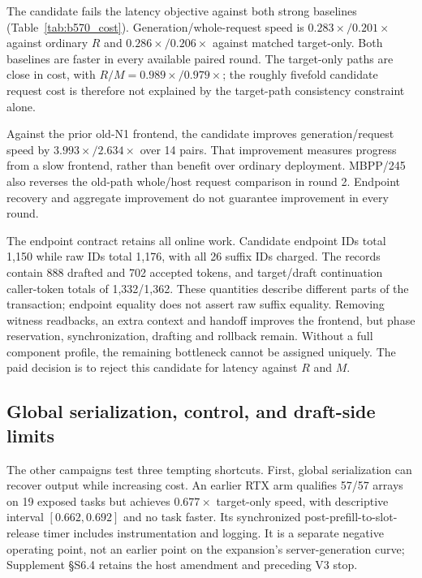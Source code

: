 The candidate fails the latency objective against both strong baselines (Table~\ref{tab:b570_cost}). Generation/whole-request speed is $0.283\times/0.201\times$ against ordinary $R$ and $0.286\times/0.206\times$ against matched target-only. Both baselines are faster in every available paired round. The target-only paths are close in cost, with $R/M=0.989\times/0.979\times$; the roughly fivefold candidate request cost is therefore not explained by the target-path consistency constraint alone.



Against the prior old-N1 frontend, the candidate improves generation/request speed by $3.993\times/2.634\times$ over 14 pairs. That improvement measures progress from a slow frontend, rather than benefit over ordinary deployment. MBPP/245 also reverses the old-path whole/host request comparison in round 2. Endpoint recovery and aggregate improvement do not guarantee improvement in every round.

The endpoint contract retains all online work. Candidate endpoint IDs total 1,150 while raw IDs total 1,176, with all 26 suffix IDs charged. The records contain 888 drafted and 702 accepted tokens, and target/draft continuation caller-token totals of 1,332/1,362. These quantities describe different parts of the transaction; endpoint equality does not assert raw suffix equality. Removing witness readbacks, an extra context and handoff improves the frontend, but phase reservation, synchronization, drafting and rollback remain. Without a full component profile, the remaining bottleneck cannot be assigned uniquely. The paid decision is to reject this candidate for latency against $R$ and $M$.

\subsection{Global serialization, control, and draft-side limits}
The other campaigns test three tempting shortcuts. First, global serialization can recover output while increasing cost. An earlier RTX arm qualifies 57/57 arrays on 19 exposed tasks but achieves $0.677\times$ target-only speed, with descriptive interval $[0.662,0.692]$ and no task faster. Its synchronized post-prefill-to-slot-release timer includes instrumentation and logging. It is a separate negative operating point, not an earlier point on the expansion's server-generation curve; Supplement \S S6.4 retains the host amendment and preceding V3 stop.

